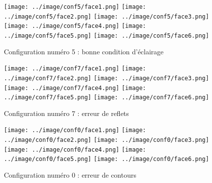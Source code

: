   \begin{figure*}[!ht]
    \centering
    \texttt{[image: ../image/conf5/face1.png]}
    \texttt{[image: ../image/conf5/face2.png]}
    \texttt{[image: ../image/conf5/face3.png]}
    \texttt{[image: ../image/conf5/face4.png]}
    \texttt{[image: ../image/conf5/face5.png]}
    \texttt{[image: ../image/conf5/face6.png]}
    \caption{Configuration numéro 5 : bonne condition d'éclairage}
    \label{fig:conf5}
   \end{figure*}

  \begin{figure*}[!ht]
    \centering
    \texttt{[image: ../image/conf7/face1.png]}
    \texttt{[image: ../image/conf7/face2.png]}
    \texttt{[image: ../image/conf7/face3.png]}
    \texttt{[image: ../image/conf7/face4.png]}
    \texttt{[image: ../image/conf7/face5.png]}
    \texttt{[image: ../image/conf7/face6.png]}
    \caption{Configuration numéro 7 : erreur de reflets}
    \label{fig:conf7}
   \end{figure*}

  \begin{figure*}[!ht]
    \centering
    \texttt{[image: ../image/conf0/face1.png]}
    \texttt{[image: ../image/conf0/face2.png]}
    \texttt{[image: ../image/conf0/face3.png]}
    \texttt{[image: ../image/conf0/face4.png]}
    \texttt{[image: ../image/conf0/face5.png]}
    \texttt{[image: ../image/conf0/face6.png]}
    \caption{Configuration numéro 0 : erreur de contours}
    \label{fig:conf0}
   \end{figure*}
